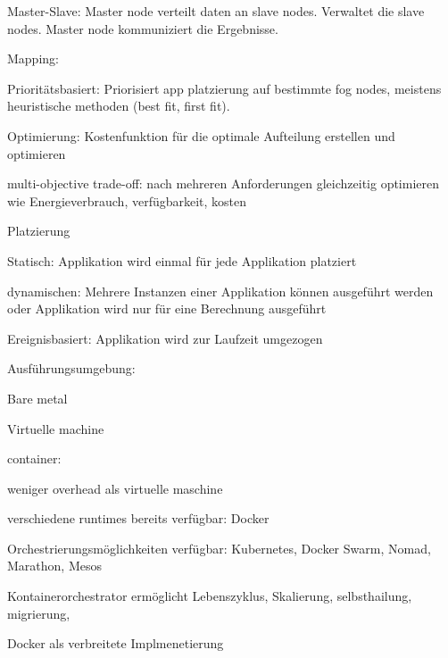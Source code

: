 \begin{notes}
\begin{notes}
\begin{notes}
\begin{notes}
                \item Master-Slave: Master node verteilt daten an slave nodes. Verwaltet die slave nodes. Master node kommuniziert die Ergebnisse.
            \end{notes}
            \item Mapping:
            \begin{notes}
                \item Prioritätsbasiert: Priorisiert app platzierung auf bestimmte fog nodes, meistens heuristische methoden (best fit, first fit). 
                \item Optimierung: Kostenfunktion für die optimale Aufteilung erstellen und optimieren
                \item multi-objective trade-off: nach mehreren Anforderungen gleichzeitig optimieren wie Energieverbrauch, verfügbarkeit, kosten
            \end{notes}
            \item Platzierung
            \begin{notes}
                \item Statisch: Applikation wird einmal für jede Applikation platziert
                \item dynamischen: Mehrere Instanzen einer Applikation können ausgeführt werden oder Applikation wird nur für eine Berechnung ausgeführt
                \item Ereignisbasiert: Applikation wird zur Laufzeit umgezogen
            \end{notes}
            \item Ausführungsumgebung:
            \begin{notes}
                \item Bare metal
                \item Virtuelle machine
                \item container: \cite{Costa2022}
                \item   weniger overhead als virtuelle maschine
                \item   verschiedene runtimes bereits verfügbar: Docker
                \item   Orchestrierungsmöglichkeiten verfügbar: Kubernetes, Docker Swarm, Nomad, Marathon, Mesos
                \item   Kontainerorchestrator ermöglicht Lebenszyklus, Skalierung, selbsthailung, migrierung, 
                \item   Docker als verbreitete Implmenetierung

\end{notes}
\end{notes}
\end{notes}
\end{notes}
